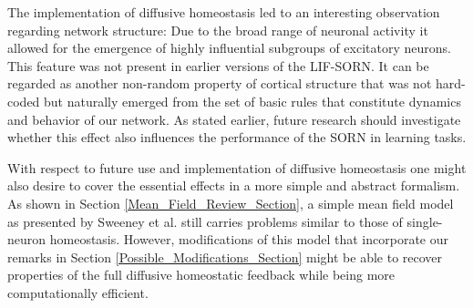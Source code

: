 \documentclass[10pt,a4paper]{article}
\begin{document}
The implementation of diffusive homeostasis led to an interesting observation regarding network structure: Due to the broad range of neuronal activity it allowed for the emergence of highly influential subgroups of excitatory neurons. This feature was not present in earlier versions of the LIF-SORN. It can be regarded as another non-random property of cortical structure that was not hard-coded but naturally emerged from the set of basic rules that constitute dynamics and behavior of our network. As stated earlier, future research should investigate whether this effect also influences the performance of the SORN in learning tasks. 

With respect to future use and implementation of diffusive homeostasis one might also desire to cover the essential effects in a more simple and abstract formalism. As shown in Section \ref{Mean_Field_Review_Section}, a simple mean field model as presented by Sweeney et al. still carries problems similar to those of single-neuron homeostasis. However, modifications of this model that incorporate our remarks in Section \ref{Possible_Modifications_Section} might be able to recover properties of the full diffusive homeostatic feedback while being more computationally efficient.   

\clearpage
\afterpage{\null\newpage}
\clearpage




\clearpage
\afterpage{\null\newpage}
\clearpage
\end{document}
